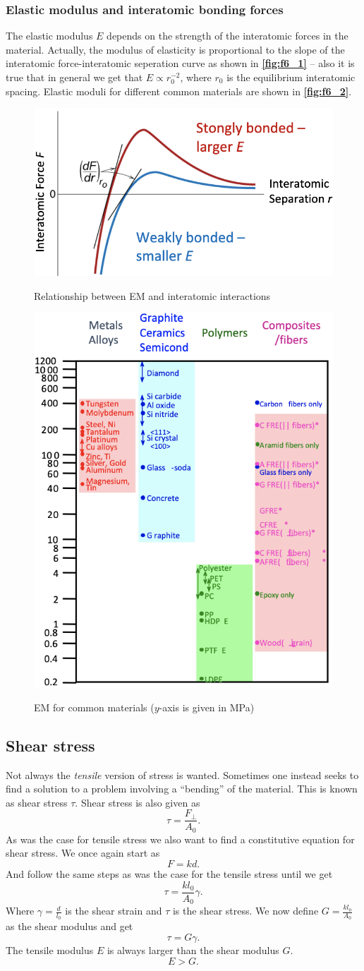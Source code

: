 \subsubsection{Elastic modulus and interatomic bonding forces}
The elastic modulus $E$ depends on the strength of the interatomic forces in the material. Actually, the modulus of elasticity is proportional to the slope of the interatomic force-interatomic seperation curve as shown in \textbf{\autoref{fig:f6_1}} -- also it is true that in general we get that $E \propto r_0^{-2}$, where $r_0$ is the equilibrium interatomic spacing. Elastic moduli for different common materials are shown in \textbf{\autoref{fig:f6_2}}.
\begin{figure} [ht]
  \centering
  \caption{Relationship between EM and interatomic interactions}
  \includegraphics[width=0.5\linewidth]{./figures/f6_1.png}
  \label{fig:f6_1}
\end{figure}
\begin{figure} [ht]
  \centering
  \caption{EM for common materials ($y$-axis is given in MPa)}
  \includegraphics[width=0.35\linewidth]{./figures/f6_2.png}
  \label{fig:f6_2}
\end{figure}

\subsection{Shear stress}
Not always the \textit{tensile} version of stress is wanted. Sometimes one instead seeks to find a solution to a problem involving a ``bending'' of the material. This is known as shear stress $\tau$. Shear stress is also given as
\[ 
\tau = \frac{F_{\perp}}{A_0}
.\]
As was the case for tensile stress we also want to find a constitutive equation for shear stress. We once again start as
\[ 
F = k d
.\]
And follow the same steps as was the case for the tensile stress until we get
\[ 
\tau = \frac{k l_0}{A_0} \gamma
.\]
Where $\gamma = \frac{d}{l_0}$ is the shear strain and $\tau$ is the shear stress. We now define $G = \frac{k l_0}{A_0}$ as the shear modulus and get
\[ 
\tau = G \gamma
.\]
The tensile modulus $E$ is always larger than the shear modulus $G$.
\[ 
E > G
.\]

